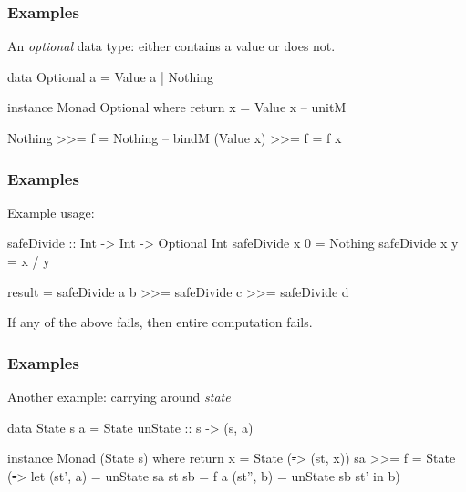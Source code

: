 \documentclass{beamer}
\begin{document}

\begin{frame}[fragile]
\frametitle{Examples}

An \emph{optional} data type: either contains a value or does not.

\begin{code}
data Optional a = Value a | Nothing

instance Monad Optional where
  return x = Value x        -- unitM

  Nothing   >>= f = Nothing -- bindM
  (Value x) >>= f = f x
\end{code}

\end{frame}


\begin{frame}[fragile]
\frametitle{Examples}

Example usage:

\begin{code}
safeDivide :: Int -> Int -> Optional Int
safeDivide x 0 = Nothing
safeDivide x y = x / y

result = safeDivide a b >>= safeDivide c
                        >>= safeDivide d
\end{code}

If any of the above fails, then entire computation fails.

\end{frame}


\begin{frame}[fragile]
\frametitle{Examples}

Another example: carrying around \emph{state}

\begin{code}
data State s a = State { unState :: s -> (s, a) }

instance Monad (State s) where
  return x = State (\st -> (st, x))
  sa >>= f = State (\st -> let (st', a)  = unState sa st
                               sb        = f a
                               (st'', b) = unState sb st'
                           in b)
\end{code}

\end{frame}
\end{document}
